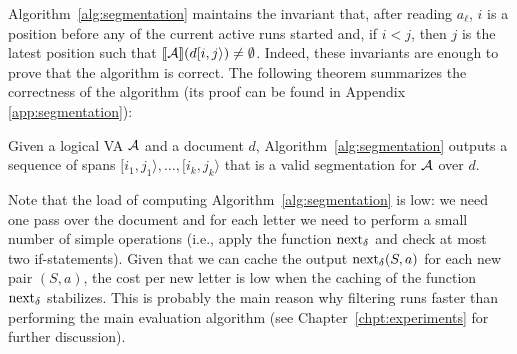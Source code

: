 Algorithm~\ref{alg:segmentation} maintains the invariant that, after reading
$a_\ell$, $i$ is a position before any of the current active runs started and,
if $i < j$,  then $j$ is the latest position such that $\llbracket\mathcal{A}\rrbracket(d[i, j\rangle)
\neq \emptyset$. Indeed, these invariants are enough to prove that the algorithm
is correct. The following theorem summarizes the correctness of the algorithm
(its proof can be found in Appendix \ref*{app:segmentation}):

\begin{theorem}\label{theo:segmentation} Given a logical VA $\mathcal{A}$ and a document
	$d$, Algorithm~\ref{alg:segmentation} outputs a sequence of spans $[i_1,
	j_1\rangle, \ldots, [i_k, j_k\rangle$ that is a valid segmentation for $\mathcal{A}$
	over $d$.
\end{theorem}

Note that the load of computing Algorithm~\ref{alg:segmentation} is low: we need
one pass over the document and for each letter we need to perform a small number
of simple operations (i.e., apply the function $\operatorname{next}_{\delta}$ and check at most two
if-statements). Given that we can cache the output $\operatorname{next}_{\delta}(S, a)$ for each new
pair $(S, a)$, the cost per new letter is low when the caching of the function
$\operatorname{next}_{\delta}$ stabilizes. This is probably the main reason why filtering runs faster
than performing the main evaluation algorithm (see
Chapter~\ref{chpt:experiments} for further discussion).


